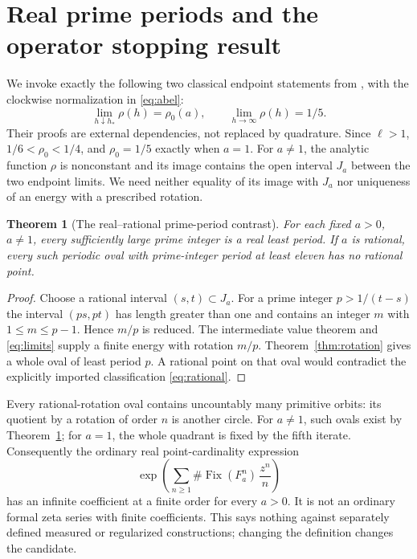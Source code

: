 \documentclass[10pt]{article}
\newcommand{\Fix}{\operatorname{Fix}}
\newtheorem{theorem}{Theorem}
\begin{document}
\section{Real prime periods and the operator stopping result}
We invoke exactly the following two classical endpoint statements from
\cite[Propositions 6--7]{br}, with the clockwise normalization in
\eqref{eq:abel}:
\begin{equation}\label{eq:limits}
 \lim_{h\downarrow h_*}\rho(h)=\rho_0(a),\qquad
 \lim_{h\to\infty}\rho(h)=1/5.
\end{equation}
Their proofs are external dependencies, not replaced by quadrature.
Since $\ell>1$, $1/6<\rho_0<1/4$, and $\rho_0=1/5$ exactly when $a=1$.
For $a\ne1$, the analytic function $\rho$ is nonconstant and its image
contains the open interval $J_a$ between the two endpoint limits.
We need neither equality of its image with $J_a$ nor uniqueness of an
energy with a prescribed rotation.

\begin{theorem}[The real--rational prime-period contrast]\label{thm:contrast}
For each fixed $a>0$, $a\ne1$, every sufficiently large prime integer
is a real least period. If $a$ is rational, every such periodic oval
with prime-integer period at least eleven has no rational point.
\end{theorem}
\begin{proof}
Choose a rational interval $(s,t)\subset J_a$. For a prime integer
$p>1/(t-s)$ the interval $(ps,pt)$ has length greater than one and
contains an integer $m$ with $1\le m\le p-1$. Hence $m/p$ is reduced.
The intermediate value theorem and \eqref{eq:limits} supply a finite
energy with rotation $m/p$. Theorem~\ref{thm:rotation} gives a whole
oval of least period $p$. A rational point on that oval would contradict
the explicitly imported classification \eqref{eq:rational}.
\end{proof}

Every rational-rotation oval contains uncountably many primitive
orbits: its quotient by a rotation of order $n$ is another circle.
For $a\ne1$, such ovals exist by Theorem~\ref{thm:contrast}; for $a=1$,
the whole quadrant is fixed by the fifth iterate. Consequently the
ordinary real point-cardinality expression
\begin{equation}\label{eq:undefined}
 \exp\left(\sum_{n\ge1}\#\Fix(F_a^n)\,\frac{z^n}{n}\right)
\end{equation}
has an infinite coefficient at a finite order for every $a>0$.
It is not an ordinary formal zeta series with finite coefficients.
This says nothing against separately defined measured or regularized
constructions; changing the definition changes the candidate.
\end{document}
